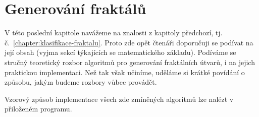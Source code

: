 \chapter{Generování fraktálů}\label{chapter:generovani-fraktalu}

V této poslední kapitole navážeme na znalosti z kapitoly předchozí, tj. č.~\ref{chapter:klasifikace-fraktalu}. Proto zde opět čtenáři doporučuji se podívat na její obsah (vyjma sekcí týkajících se matematického základu). Podíváme se stručný teoretický rozbor algoritmů pro generování fraktálních útvarů, i na jejich praktickou implementaci. Než tak však učiníme, uděláme si krátké povídání o způsobu, jakým budeme rozbory vůbec provádět.

Vzorový způsob implementace všech zde zmíněných algoritmů lze nalézt v přiloženém programu.




